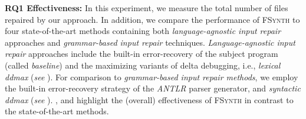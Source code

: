 \documentclass[sigconf,review,anonymous]{acmart}
\newcounter{todocounter}
\newcommand{\todo}[1]{\marginpar{$|$}\textcolor{red}{\stepcounter{todocounter}\footnote[\thetodocounter]{\textcolor{red}{\textbf{TODO }}\textit{#1}}}}
\newcommand{\recheck}[1]{\textcolor{red}{#1}}
\renewcommand{\todo}[1]{}
\newcommand{\approach}{\textsc{FSynth}\xspace}
\begin{document}
\noindent
\textbf{RQ1 Effectiveness:} 
In this experiment,
we measure the total number of files repaired by our approach. In addition, we compare 
the performance of \approach to 
four state-of-the-art methods containing 
both \textit{language-agnostic input repair} approaches and \textit{grammar-based input repair} techniques. 
\textit{Language-agnostic input repair} approaches include the built-in error-recovery of the subject program (called \textit{baseline}) and the maximizing variants of delta debugging, i.e., \textit{lexical ddmax} (\textit{see}  ). 
For comparison to \textit{grammar-based input repair methods}, we employ the built-in error-recovery strategy of the \textit{ANTLR} parser generator, and \textit{syntactic ddmax}  (\textit{see}  ). 
,  and  highlight the (overall) effectiveness of \approach in contrast to the state-of-the-art methods. 


\end{document}
